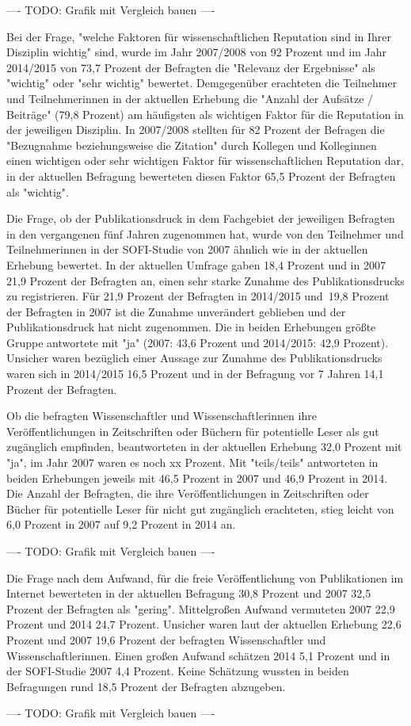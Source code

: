 ---- TODO: Grafik mit Vergleich bauen ----

Bei der Frage, "welche Faktoren für wissenschaftlichen Reputation sind in Ihrer Disziplin wichtig" sind, wurde im Jahr 2007/2008 von 92 Prozent und im Jahr 2014/2015 von 73,7 Prozent der Befragten die "Relevanz der Ergebnisse" als "wichtig" oder "sehr wichtig" bewertet. Demgegenüber erachteten die Teilnehmer und Teilnehmerinnen in der aktuellen Erhebung die "Anzahl der Aufsätze / Beiträge" (79,8 Prozent) am häufigsten als wichtigen Faktor für die Reputation in der jeweiligen Disziplin. In 2007/2008 stellten für 82 Prozent der Befragen die "Bezugnahme beziehungsweise die Zitation" durch Kollegen und Kolleginnen einen wichtigen oder sehr wichtigen Faktor für wissenschaftlichen Reputation dar, in der aktuellen Befragung bewerteten diesen Faktor 65,5 Prozent der Befragten als "wichtig".

Die Frage, ob der Publikationsdruck in dem Fachgebiet der jeweiligen Befragten in den vergangenen fünf Jahren zugenommen hat, wurde von den Teilnehmer und Teilnehmerinnen in der SOFI-Studie von 2007 ähnlich wie in der aktuellen Erhebung bewertet. In der aktuellen Umfrage gaben 18,4 Prozent und in 2007 21,9 Prozent der Befragten an, einen sehr starke Zunahme des Publikationsdrucks zu registrieren. Für 21,9 Prozent der Befragten in 2014/2015 und 19,8 Prozent der Befragten in 2007 ist die Zunahme unverändert geblieben und der Publikationsdruck hat nicht zugenommen. Die in beiden Erhebungen größte Gruppe antwortete mit "ja" (2007: 43,6 Prozent und 2014/2015: 42,9 Prozent). Unsicher waren bezüglich einer Aussage zur Zunahme des Publikationsdrucks waren sich in 2014/2015 16,5 Prozent und in der Befragung vor 7 Jahren 14,1 Prozent der Befragten.

Ob die befragten Wissenschaftler und Wissenschaftlerinnen ihre Veröffentlichungen in Zeitschriften oder Büchern für potentielle Leser als gut zugänglich empfinden, beantworteten in der aktuellen Erhebung 32,0 Prozent mit "ja", im Jahr 2007 waren es noch xx Prozent. Mit "teils/teils" antworteten in beiden Erhebungen jeweils mit 46,5 Prozent in 2007 und 46,9 Prozent in 2014. Die Anzahl der Befragten, die ihre Veröffentlichungen in Zeitschriften oder Bücher für potentielle Leser für nicht gut zugänglich erachteten, stieg leicht von 6,0 Prozent in 2007 auf 9,2 Prozent in 2014 an.

---- TODO: Grafik mit Vergleich bauen ----

Die Frage nach dem Aufwand, für die freie Veröffentlichung von Publikationen im Internet bewerteten in der aktuellen Befragung 30,8 Prozent und 2007 32,5 Prozent der Befragten als "gering". Mittelgroßen Aufwand vermuteten 2007 22,9 Prozent und 2014 24,7 Prozent. Unsicher waren laut der aktuellen Erhebung 22,6 Prozent und 2007 19,6 Prozent der befragten Wissenschaftler und Wissenschaftlerinnen. Einen großen Aufwand schätzen 2014 5,1 Prozent und in der SOFI-Studie 2007 4,4 Prozent. Keine Schätzung wussten in beiden Befragungen rund 18,5 Prozent der Befragten abzugeben.

---- TODO: Grafik mit Vergleich bauen ----
